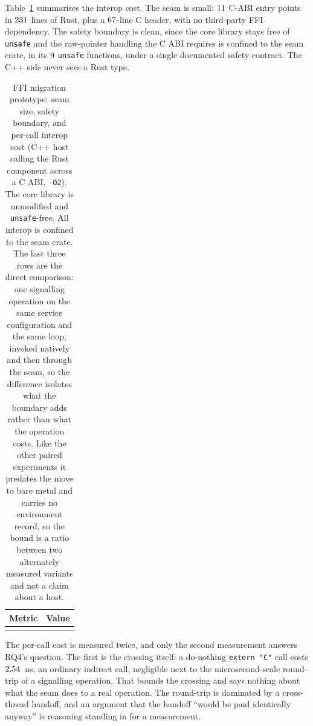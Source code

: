 \documentclass[english,oneside,a4paper,censored,csm,software-track-2020]{HYthesisML}
\begin{document}
Table~\ref{tab:ffi} summarises the interop cost. The
seam is small: $11$ C-ABI entry points in $231$ lines of Rust, plus a
$67$-line C
header, with no third-party FFI dependency. The safety boundary is clean, since the core library
stays free of \texttt{unsafe} and the raw-pointer handling the C ABI requires is confined
to the seam crate, in its $9$ \texttt{unsafe} functions, under a single documented
safety contract. The C++ side never sees a Rust type.

\begin{table}[H]
\centering
\caption[FFI migration prototype: seam size, safety, and cost]{FFI migration prototype: seam size, safety boundary, and per-call interop cost
(C++ host calling the Rust component across a C ABI, \texttt{-O2}). The core library is
unmodified and \texttt{unsafe}-free. All interop is confined to the seam crate. The last
three rows are the direct comparison: one signalling operation on the same service
configuration and the same loop, invoked natively and then through the seam, so the
difference isolates what the boundary adds rather than what the operation
costs. Like the other paired experiments it predates the move to bare metal and carries no
environment record, so the bound is a ratio between two alternately measured variants and not a claim
about a host.\label{tab:ffi}}
\begin{tabular}{l r}
\hline\hline
Metric & Value \\
\hline
\\
\hline
\end{tabular}
\end{table}

The per-call cost is measured twice, and only the second measurement answers RQ4's question. The
first is the crossing itself: a do-nothing \texttt{extern "C"} call costs $2.54$~ns, an
ordinary indirect call, negligible next to the microsecond-scale round-trip of a signalling
operation. That bounds the crossing and says nothing about what the seam does to a real operation.
The round-trip is dominated by a cross-thread handoff, and an argument that the handoff ``would be
paid identically anyway'' is reasoning standing in for a measurement.
\end{document}
